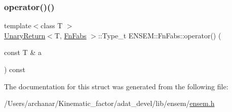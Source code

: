 \mbox{\label{structENSEM_1_1FnFabs_a655393f2e089d6fb5f266991b83ffb12}} 
\subsubsection{\texorpdfstring{operator()()}{operator()()}\hspace{0.1cm}{\footnotesize\ttfamily [2/2]}}
{\footnotesize\ttfamily template$<$class T $>$ \\
\mbox{\hyperlink{structENSEM_1_1UnaryReturn}{Unary\+Return}}$<$T, \mbox{\hyperlink{structENSEM_1_1FnFabs}{Fn\+Fabs}} $>$\+::Type\+\_\+t E\+N\+S\+E\+M\+::\+Fn\+Fabs\+::operator() (\begin{DoxyParamCaption}\item[{const T \&}]{a }\end{DoxyParamCaption}) const\hspace{0.3cm}{\ttfamily [inline]}}



The documentation for this struct was generated from the following file\+:\begin{DoxyCompactItemize}
\item 
/\+Users/archanar/\+Kinematic\+\_\+factor/adat\+\_\+devel/lib/ensem/\mbox{\hyperlink{lib_2ensem_2ensem_8h}{ensem.\+h}}\end{DoxyCompactItemize}
